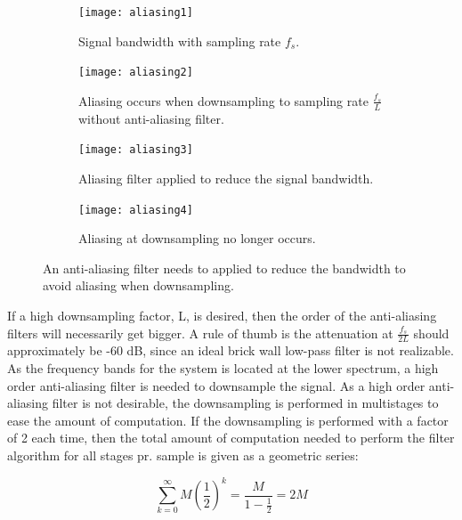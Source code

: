 \begin{figure}[H]
\centering
\begin{subfigure}[t]{0.44\textwidth}
\texttt{[image: aliasing1]}
	\caption{Signal bandwidth with sampling rate $f_s$.}
	\label{fig:aliasing1}
\end{subfigure}
\hspace{6mm} 
\begin{subfigure}[t]{0.47\textwidth}
\texttt{[image: aliasing2]}
	\caption{Aliasing occurs when downsampling to sampling rate $\frac{f_s}{L}$ without anti-aliasing filter.}
	\label{fig:aliasing2}
\end{subfigure}
\hspace{6mm}
\begin{subfigure}[b]{0.44\textwidth}
\texttt{[image: aliasing3]}
	\caption{Aliasing filter applied to reduce the signal bandwidth.}
	\label{fig:aliasing3}
\end{subfigure}
\hspace{6mm} 
\begin{subfigure}[b]{0.47\textwidth}
\texttt{[image: aliasing4]}
	\caption{Aliasing at downsampling no longer occurs.}
	\label{fig:aliasing4}
\end{subfigure}
\caption{An anti-aliasing filter needs to applied to reduce the bandwidth to avoid aliasing when downsampling.}
\label{fig:aliasing}
\end{figure}

If a high downsampling factor, L, is desired, then the order of the anti-aliasing filters will necessarily get bigger. A rule of thumb is the attenuation at $\frac{f_s}{2L}$ should approximately be -60 dB, since an ideal brick wall low-pass filter is not realizable. As the frequency bands for the system is located at the lower spectrum, a high order anti-aliasing filter is needed to downsample the signal. As a high order anti-aliasing filter is not desirable, the downsampling is performed in multistages to ease the amount of computation. If the downsampling is performed with a factor of 2 each time, then the total amount of computation needed to perform the filter algorithm for all stages pr. sample is given as a geometric series:

\begin{equation} \label{eq:z_transformation_example}
\sum_{k=0}^{\infty}M \left( \frac{1}{2} \right)^k  = \frac{M}{1-\frac{1}{2}} = 2M
\end{equation}
\begin{where}
\end{where}

